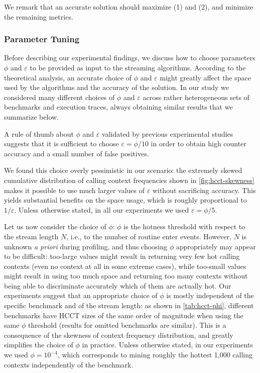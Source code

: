\noindent We remark that an accurate solution should maximize (1) and (2), and minimize the remaining metrics.

\subsubsection*{Parameter Tuning}

Before describing our experimental findings, we discuss how to choose parameters $\phi$ and $\varepsilon$ to be provided as input to the streaming algorithms. According to the theoretical analysis, an accurate choice of $\phi$ and $\varepsilon$  might greatly affect the space used by the algorithms and the accuracy of the solution. In our study we considered many different choices of $\phi$ and $\varepsilon$ across rather heterogeneous sets of benchmarks and execution traces, always obtaining similar results that we summarize below. 

A rule of thumb about $\phi$ and $\varepsilon$ validated by previous experimental studies~\cite{Cormode08} suggests that it is sufficient to choose $\varepsilon=\phi/10$ in order to obtain high counter accuracy and a small number of false positives.

We found this choice overly pessimistic in our scenario: the extremely skewed cumulative distribution of calling context frequencies shown in \myfigure\ref{fig:hcct-skewness}  makes it possible to use much larger values of $\varepsilon$ without sacrificing accuracy. This yields substantial benefits on the space usage, which is roughly proportional to $1/\varepsilon$. Unless otherwise stated, in all our experiments we used $\varepsilon=\phi/5$.

Let us now consider the choice of $\phi$: $\phi$ is the hotness threshold with respect to the stream length $N$, i.e., to the number of routine enter events. However, $N$ is unknown {\em a priori} during profiling, and thus choosing $\phi$ appropriately may appear to be difficult: too-large values might result in returning very few hot calling contexts (even no context at all in some extreme cases), while too-small values might result in using too much space and returning too many contexts without being able to discriminate accurately which of them are actually hot. Our experiments suggest that an appropriate choice of $\phi$ is mostly independent of the specific benchmark and of the stream length: as shown in \mytable\ref{tab:hcct-phi}, different benchmarks have HCCT sizes of the same order of magnitude when using the same $\phi$ threshold (results for omitted benchmarks are similar). This is a consequence of the skewness of context frequency distribution, and greatly simplifies the choice of $\phi$ in practice. Unless otherwise stated, in our experiments we used $\phi=10^{-4}$, which corresponds to mining roughly the hottest 1,000 calling contexts independently of the benchmark.

